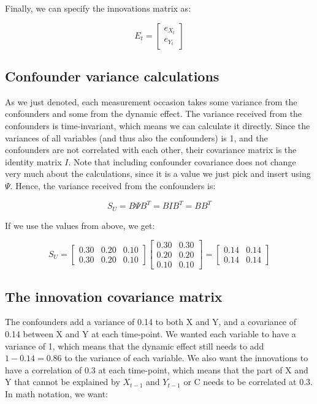 \documentclass{article}
\begin{document}
\noindent
Finally, we can specify the innovations matrix as:

\[
E_t = \begin{bmatrix} e_{X_t} \\ e_{Y_t} \end{bmatrix}
\]

\newpage

\subsection*{Confounder variance calculations}

\noindent
As we just denoted, each measurement occasion takes some variance from the confounders and some from the dynamic effect. The variance received from
the confounders is time-invariant, which means we can calculate it directly. Since the variances of all variables (and thus also the confounders) is 1,
and the confounders are not correlated with each other, their covariance matrix is the identity matrix $I$. Note that including confounder covariance
does not change very much about the calculations, since it is a value we just pick and insert using $\Psi$. Hence, the variance received from the confounders is:

\[
S_U = B \Psi B^T = B I B^T = B B^T
\]

\noindent
If we use the values from above, we get: 

\[
S_U = 
\begin{bmatrix} 0.30 & 0.20 & 0.10 \\ 0.30 & 0.20 & 0.10 \end{bmatrix}
\begin{bmatrix} 0.30 & 0.30 \\ 0.20 & 0.20 \\ 0.10 & 0.10 \end{bmatrix}
= 
\begin{bmatrix} 0.14 & 0.14 \\ 0.14 & 0.14 \end{bmatrix}
\]

\newpage

\subsection*{The innovation covariance matrix}

\noindent
The confounders add a variance of 0.14 to both X and Y, and a covariance of 0.14 between X and Y at each time-point. We wanted each variable to have 
a variance of 1, which means that the dynamic effect still needs to add $1 - 0.14 = 0.86$ to the variance of each variable. We also want the innovations 
to have a correlation of 0.3 at each time-point, which means that the part of X and Y that cannot be explained by $X_{t-1}$ and $Y_{t-1}$ or C needs to 
be correlated at 0.3. In math notation, we want:
\end{document}
